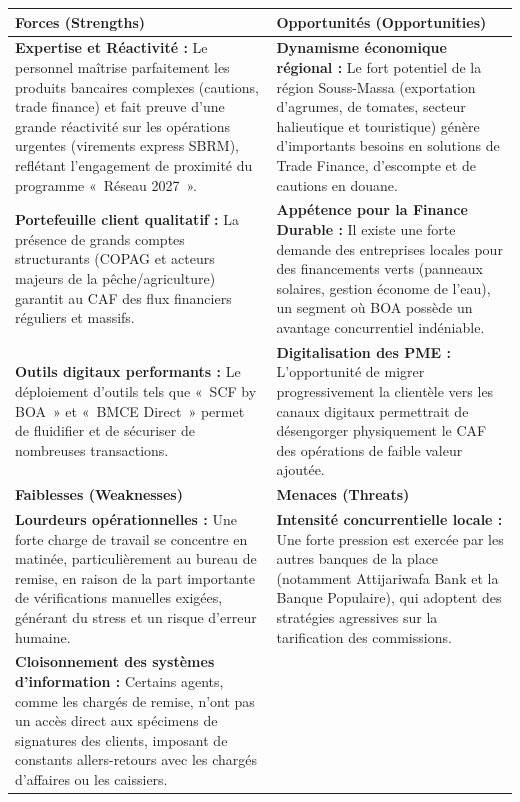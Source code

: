 \begin{table}[h!]
\centering
\renewcommand{\arraystretch}{1.4}
\begin{tabularx}{\textwidth}{|X|X|}
\hline
\rowcolor{gray!20}
\textbf{Forces (Strengths)} & \textbf{Opportunités (Opportunities)} \\
\hline
\textbf{Expertise et Réactivité :} Le personnel maîtrise parfaitement les produits bancaires complexes (cautions, trade finance) et fait preuve d'une grande réactivité sur les opérations urgentes (virements express SBRM), reflétant l'engagement de proximité du programme «~Réseau 2027~».
&
\textbf{Dynamisme économique régional :} Le fort potentiel de la région Souss-Massa (exportation d'agrumes, de tomates, secteur halieutique et touristique) génère d'importants besoins en solutions de Trade Finance, d'escompte et de cautions en douane. \\
\hline
\textbf{Portefeuille client qualitatif :} La présence de grands comptes structurants (COPAG et acteurs majeurs de la pêche/agriculture) garantit au CAF des flux financiers réguliers et massifs.
&
\textbf{Appétence pour la Finance Durable :} Il existe une forte demande des entreprises locales pour des financements verts (panneaux solaires, gestion économe de l'eau), un segment où BOA possède un avantage concurrentiel indéniable. \\
\hline
\textbf{Outils digitaux performants :} Le déploiement d'outils tels que «~SCF by BOA~» et «~BMCE Direct~» permet de fluidifier et de sécuriser de nombreuses transactions.
&
\textbf{Digitalisation des PME :} L'opportunité de migrer progressivement la clientèle vers les canaux digitaux permettrait de désengorger physiquement le CAF des opérations de faible valeur ajoutée. \\
\hline
\rowcolor{gray!20}
\textbf{Faiblesses (Weaknesses)} & \textbf{Menaces (Threats)} \\
\hline
\textbf{Lourdeurs opérationnelles :} Une forte charge de travail se concentre en matinée, particulièrement au bureau de remise, en raison de la part importante de vérifications manuelles exigées, générant du stress et un risque d'erreur humaine.
&
\textbf{Intensité concurrentielle locale :} Une forte pression est exercée par les autres banques de la place (notamment Attijariwafa Bank et la Banque Populaire), qui adoptent des stratégies agressives sur la tarification des commissions. \\
\hline
\textbf{Cloisonnement des systèmes d'information :} Certains agents, comme les chargés de remise, n'ont pas un accès direct aux spécimens de signatures des clients, imposant de constants allers-retours avec les chargés d'affaires ou les caissiers.

\end{tabularx}
\end{table}
